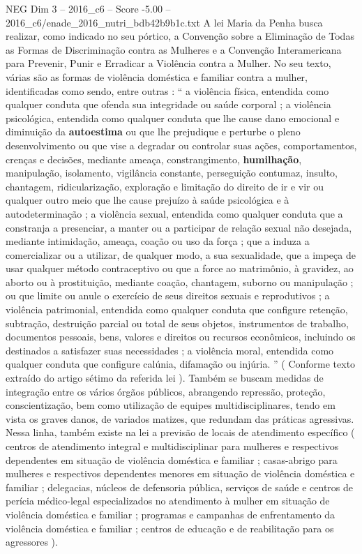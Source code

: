 \begin{textsample}{NEG Dim 3 – 2016\_c6 – Score -5.00 – 2016\_c6/enade\_2016\_nutri\_bdb42b9b1c.txt}
A lei Maria da Penha busca realizar, como indicado no seu pórtico, a Convenção sobre a Eliminação de Todas as Formas de Discriminação contra as Mulheres e a Convenção Interamericana para Prevenir, Punir e Erradicar a Violência contra a Mulher.
No seu texto, várias são as formas de violência doméstica e familiar contra a mulher, identificadas como sendo, entre outras : “ a violência física, entendida como qualquer conduta que ofenda sua integridade ou saúde corporal ; a violência psicológica, entendida como qualquer conduta que lhe cause dano emocional e diminuição da \textbf{autoestima} ou que lhe prejudique e perturbe o pleno desenvolvimento ou que vise a degradar ou controlar suas ações, comportamentos, crenças e decisões, mediante ameaça, constrangimento, \textbf{humilhação}, manipulação, isolamento, vigilância constante, perseguição contumaz, insulto, chantagem, ridicularização, exploração e limitação do direito de ir e vir ou qualquer outro meio que lhe cause prejuízo à saúde psicológica e à autodeterminação ; a violência sexual, entendida como qualquer conduta que a constranja a presenciar, a manter ou a participar de relação sexual não desejada, mediante intimidação, ameaça, coação ou uso da força ; que a induza a comercializar ou a utilizar, de qualquer modo, a sua sexualidade, que a impeça de usar qualquer método contraceptivo ou que a force ao matrimônio, à gravidez, ao aborto ou à prostituição, mediante coação, chantagem, suborno ou manipulação ; ou que limite ou anule o exercício de seus direitos sexuais e reprodutivos ; a violência patrimonial, entendida como qualquer conduta que configure retenção, subtração, destruição parcial ou total de seus objetos, instrumentos de trabalho, documentos pessoais, bens, valores e direitos ou recursos econômicos, incluindo os destinados a satisfazer suas necessidades ; a violência moral, entendida como qualquer conduta que configure calúnia, difamação ou injúria. ” ( Conforme texto extraído do artigo sétimo da referida lei ).
Também se buscam medidas de integração entre os vários órgãos públicos, abrangendo repressão, proteção, conscientização, bem como utilização de equipes multidisciplinares, tendo em vista os graves danos, de variados matizes, que redundam das práticas agressivas.
Nessa linha, também existe na lei a previsão de locais de atendimento específico ( centros de atendimento integral e multidisciplinar para mulheres e respectivos dependentes em situação de violência doméstica e familiar ; casas-abrigo para mulheres e respectivos dependentes menores em situação de violência doméstica e familiar ; delegacias, núcleos de defensoria pública, serviços de saúde e centros de perícia médico-legal especializados no atendimento à mulher em situação de violência doméstica e familiar ; programas e campanhas de enfrentamento da violência doméstica e familiar ; centros de educação e de reabilitação para os agressores ).

\end{textsample}

